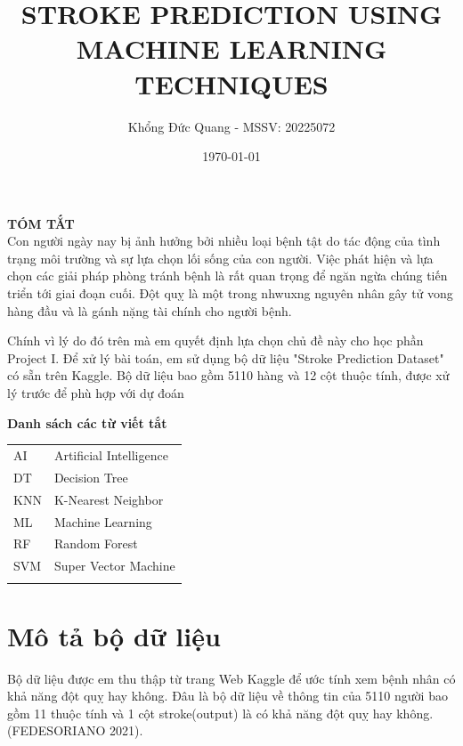 \documentclass[11pt]{article}
\title{STROKE PREDICTION USING MACHINE LEARNING TECHNIQUES}
\author{Khổng Đức Quang - MSSV: 20225072}
\date{\today}
\begin{document}
	\maketitle
	\textbf{TÓM TẮT}\\
	
	Con người ngày nay bị ảnh hưởng bởi nhiều loại bệnh tật do tác động của tình trạng môi trường và sự lựa chọn lối sống của con người. Việc phát hiện và lựa chọn các giải pháp phòng tránh bệnh là rất quan trọng để ngăn ngừa chúng tiến triển tới giai đoạn cuối. Đột quỵ là một trong nhwuxng nguyên nhân gây tử vong hàng đầu và là gánh nặng tài chính cho người bệnh.
	
	Chính vì lý do đó trên mà em quyết định lựa chọn chủ đề này cho học phần Project I. Để xử lý bài toán, em sử dụng bộ dữ liệu "Stroke Prediction Dataset" có sẵn trên Kaggle. Bộ dữ liệu bao gồm 5110 hàng và 12 cột thuộc tính, được xử lý trước để phù hợp với dự đoán
	
	\pagebreak
	
	\textbf{Danh sách các từ viết tắt}\\
	
	\begin{tabular}{l l}
		
		\vspace{0.25cm}
		AI  & Artificial Intelligence \\
		\vspace{0.25cm}
		DT  & Decision Tree \\
		\vspace{0.25cm}
		KNN & K-Nearest Neighbor \\
		\vspace{0.25cm}
		ML  & Machine Learning \\
		\vspace{0.25cm}
		RF  & Random Forest \\
		\vspace{0.25cm}
		SVM & Super Vector Machine \\
		\vspace{0.25cm}
	\end{tabular}
	
	
	\pagebreak
		
	
	\section{Mô tả bộ dữ liệu}
	
	
	Bộ dữ liệu được em thu thập từ trang Web Kaggle để ước tính xem bệnh nhân có khả năng đột quỵ hay không. Đâu là bộ dữ liệu về thông tin của 5110 người bao gồm 11 thuộc tính và 1 cột stroke(output) là có khả năng đột quỵ hay không. (FEDESORIANO 2021). 
	
\end{document}
